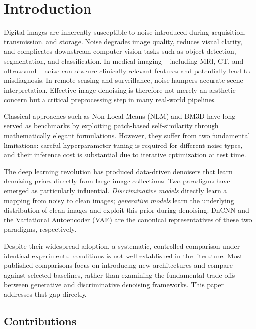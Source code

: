 \documentclass[conference]{IEEEtran}
\begin{document}
\section{Introduction}

Digital images are inherently susceptible to noise introduced during
acquisition, transmission, and storage. Noise degrades image quality,
reduces visual clarity, and complicates downstream computer vision tasks
such as object detection, segmentation, and classification. In medical
imaging -- including MRI, CT, and ultrasound -- noise can obscure
clinically relevant features and potentially lead to misdiagnosis. In
remote sensing and surveillance, noise hampers accurate scene
interpretation. Effective image denoising is therefore not merely an
aesthetic concern but a critical preprocessing step in many real-world
pipelines.

Classical approaches such as Non-Local Means (NLM) and BM3D have long
served as benchmarks by exploiting patch-based self-similarity through
mathematically elegant formulations. However, they suffer from two
fundamental limitations: careful hyperparameter tuning is required for
different noise types, and their inference cost is substantial due to
iterative optimization at test time.

The deep learning revolution has produced data-driven denoisers that
learn denoising priors directly from large image collections. Two
paradigms have emerged as particularly influential. \textit{Discriminative
models} directly learn a mapping from noisy to clean images;
\textit{generative models} learn the underlying distribution of clean
images and exploit this prior during denoising. DnCNN \cite{zhang2017beyond}
and the Variational Autoencoder (VAE) \cite{kingma2014vae} are the
canonical representatives of these two paradigms, respectively.

Despite their widespread adoption, a systematic, controlled comparison
under identical experimental conditions is not well established in the
literature. Most published comparisons focus on introducing new
architectures and compare against selected baselines, rather than
examining the fundamental trade-offs between generative and discriminative
denoising frameworks. This paper addresses that gap directly.

\subsection{Contributions}
\end{document}
